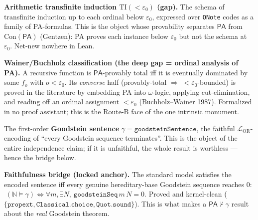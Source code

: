 \begin{definition}\label{def:ti_schema}
  \notready
\textbf{Arithmetic transfinite induction \(\mathrm{TI}({<}\varepsilon_0)\) (gap).}  The schema of
transfinite induction up to each ordinal below \(\varepsilon_0\), expressed over \texttt{ONote} codes as
a family of PA-formulas.  This is the object whose provability separates \(\mathsf{PA}\) from
\(\mathrm{Con}(\mathsf{PA})\) (Gentzen): PA proves each instance below \(\varepsilon_0\) but not the
schema at \(\varepsilon_0\).  Net-new nowhere in Lean.
\end{definition}

\begin{definition}\label{def:wainer_class}
  \notready
\textbf{Wainer/Buchholz classification (the deep gap = ordinal analysis of PA).}  A recursive function
is \(\mathsf{PA}\)-provably total iff it is eventually dominated by some \(f_o\) with \(o<\varepsilon_0\).
Its \emph{converse} half (provably-total \(\Rightarrow\) \(<\varepsilon_0\)-bounded) is proved in the
literature by embedding PA into \(\omega\)-logic, applying cut-elimination, and reading off an ordinal
assignment \(<\varepsilon_0\) (Buchholz--Wainer 1987).  Formalized in no proof assistant; this is the
Route-B face of the one intrinsic monument.
\end{definition}

\begin{definition}\label{def:encoding}
  \leanok
The first-order \textbf{Goodstein sentence} \(\gamma = \texttt{goodsteinSentence}\), the faithful
\(\mathcal{L}_{\mathrm{OR}}\)-encoding of ``every Goodstein sequence terminates''.  This is the object of
the entire independence claim; if it is unfaithful, the whole result is worthless --- hence the bridge
below.
\end{definition}

\begin{theorem}\label{thm:bridge}
  \leanok
\textbf{Faithfulness bridge (locked anchor).}  The standard model satisfies the encoded sentence iff
every genuine hereditary-base Goodstein sequence reaches \(0\):
\(\;(\mathbb{N}\models\gamma)\iff\forall m,\exists N,\ \texttt{goodsteinSeq}\,m\,N = 0\).  Proved and
kernel-clean (\(\{\texttt{propext},\texttt{Classical.choice},\texttt{Quot.sound}\}\)).  This is what
makes a \(\mathsf{PA}\nvdash\gamma\) result about the \emph{real} Goodstein theorem.
\end{theorem}


